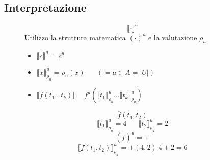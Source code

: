 \documentclass{article}
\theoremstyle{break}
\theoremstyle{break}
\theoremstyle{break}
\theoremstyle{break}
\begin{document}
  \subsection{Interpretazione}
  \begin{figure}[H]
    \begin{definition}
      \[
        \llbracket  \cdot \rrbracket^u
      \] 
      Utilizzo la struttura matematica \( ( \cdot )^u \) e la valutazione \( \rho_u \)
      \begin{itemize}
        \item \( \llbracket c\rrbracket^u = c^u \) 
        \item \( \llbracket x\rrbracket^u_{\rho_u} = \rho_u(x)\;\;\;\;\;\;(=a \in A = |U|) \) 
        \item \( \llbracket f(t_1 \ldots t_k)] = f^u(\llbracket t_1\rrbracket^u_{\rho_u} \ldots \llbracket t_k\rrbracket^u_{\rho_u}) \) 
      \end{itemize}
    \end{definition}
  \end{figure}
  \begin{figure}[H]
    \begin{example}
      \[
        \overline{f}(t_1,t_2)
      \] 
      \[
        \llbracket t_1\rrbracket^u_{\rho_u} = 4 \;\;\;\;\;\; \llbracket t_2\rrbracket^u_{\rho_u} = 2
      \] 
      \[
        (\overline{f})^u = +
      \] 
      \[
        \llbracket \overline{f}(t_1,t_2)\rrbracket^u_{\rho_u} =  +(4,2) ~ 4+2 = 6 
      \] 
    \end{example}
  \end{figure}
\end{document}
